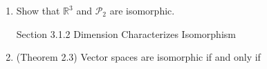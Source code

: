 \documentclass[11pt,fleqn]{article}
\begin{document}
\renewcommand{\headrulewidth}{0pt}
\newcommand{\blank}[1]{\rule{#1}{0.75pt}}
\renewcommand{\d}{\displaystyle}

\newcommand{\bpm}{\begin{pmatrix}}
\newcommand{\epm}{\end{pmatrix}}

\vspace*{-0.7in}

\begin{center}
  \large {}
\end{center}
\begin{enumerate}
\item Show that $\mathbb{R}^3$ and $\mathcal{P}_2$ are isomorphic.
\vfill
\newpage
\begin{center} Section 3.1.2  Dimension Characterizes Isomorphism\end{center}
\item (Theorem 2.3) Vector spaces are isomorphic if and only if 
\end{enumerate}
\end{document}
